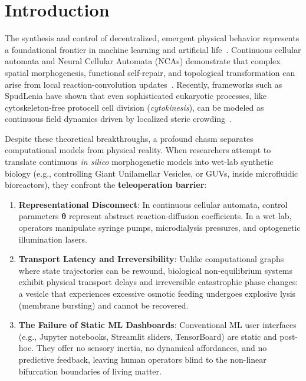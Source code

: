 \documentclass{article}
\begin{document}
\section{Introduction}

The synthesis and control of decentralized, emergent physical behavior represents a foundational frontier in machine learning and artificial life~\citep{wiener1948cybernetics, turing1952chemical, mordvintsev2020growing}. Continuous cellular automata and Neural Cellular Automata (NCAs) demonstrate that complex spatial morphogenesis, functional self-repair, and topological transformation can arise from local reaction-convolution updates~\citep{chan2019lenia, niklasson2021asynchronous, sudhakaran2021goal}. Recently, frameworks such as SpudLenia have shown that even sophisticated eukaryotic processes, like cytoskeleton-free protocell cell division (\textit{cytokinesis}), can be modeled as continuous field dynamics driven by localized steric crowding~\citep{adamala2026spudcell}.

Despite these theoretical breakthroughs, a profound chasm separates computational models from physical reality. When researchers attempt to translate continuous \textit{in silico} morphogenetic models into wet-lab synthetic biology (e.g., controlling Giant Unilamellar Vesicles, or GUVs, inside microfluidic bioreactors), they confront the \textbf{teleoperation barrier}:
\begin{enumerate}
    \item \textbf{Representational Disconnect}: In continuous cellular automata, control parameters $\boldsymbol{\theta}$ represent abstract reaction-diffusion coefficients. In a wet lab, operators manipulate syringe pumps, microdialysis pressures, and optogenetic illumination lasers.
    \item \textbf{Transport Latency and Irreversibility}: Unlike computational graphs where state trajectories can be rewound, biological non-equilibrium systems exhibit physical transport delays and irreversible catastrophic phase changes: a vesicle that experiences excessive osmotic feeding undergoes explosive lysis (membrane bursting) and cannot be recovered.
    \item \textbf{The Failure of Static ML Dashboards}: Conventional ML user interfaces (e.g., Jupyter notebooks, Streamlit sliders, TensorBoard) are static and post-hoc. They offer no sensory inertia, no dynamical affordances, and no predictive feedback, leaving human operators blind to the non-linear bifurcation boundaries of living matter.
\end{enumerate}
\end{document}
